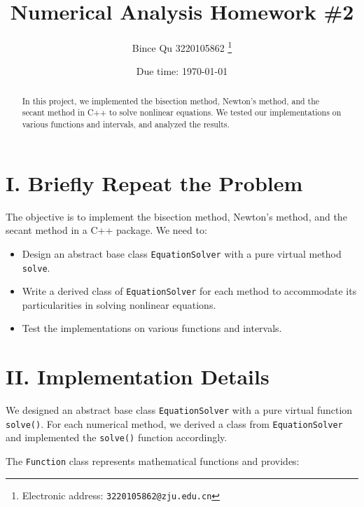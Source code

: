 \documentclass[a4paper]{article}
\begin{document}
\title{Numerical Analysis Homework \#2}

\author{Bince Qu 3220105862
  \thanks{Electronic address: \texttt{3220105862@zju.edu.cn}}}

\date{Due time: \today}

\maketitle

\begin{abstract}
    In this project, we implemented the bisection method, Newton's method, and the secant method in C++ to solve nonlinear equations. We tested our implementations on various functions and intervals, and analyzed the results.
\end{abstract}

\section*{I. Briefly Repeat the Problem}

The objective is to implement the bisection method, Newton's method, and the secant method in a C++ package. We need to:

\begin{itemize}
    \item Design an abstract base class \texttt{EquationSolver} with a pure virtual method \texttt{solve}.
    \item Write a derived class of \texttt{EquationSolver} for each method to accommodate its particularities in solving nonlinear equations.
    \item Test the implementations on various functions and intervals.
\end{itemize}

\section*{II. Implementation Details}

We designed an abstract base class \texttt{EquationSolver} with a pure virtual function \texttt{solve()}. For each numerical method, we derived a class from \texttt{EquationSolver} and implemented the \texttt{solve()} function accordingly.

The \texttt{Function} class represents mathematical functions and provides:
\end{document}
